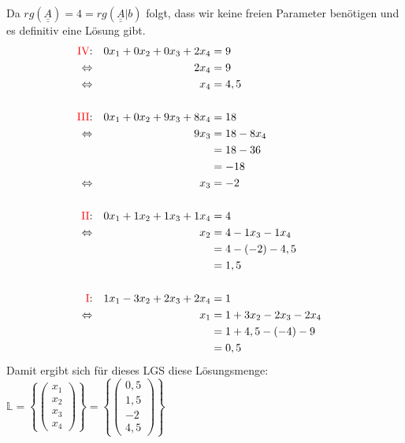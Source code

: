 \documentclass[]{article}
\newcommand{\IT}[1]{\underline{\underline{#1}}}
\newcommand{\eq}{\Leftrightarrow}
\newcommand{\red}[1]{\textcolor{red}{#1}}
\begin{document}
Da $rg(\IT{A}) = 4 = rg(\IT{A}|b)$ folgt, dass wir keine freien Parameter benötigen und es definitiv eine Lösung gibt.
\begin{align*}
	\text{\red{IV}:}&& 0x_1 + 0x_2 + 0x_3 + 2x_4 &= 9 &&\\
	\eq&& 2x_4 &= 9 &&\\
	\eq&& x_4 &= 4,5 &&\\
	\\
	\text{\red{III}:}&& 0x_1 + 0x_2 + 9x_3 + 8x_4 &= 18 &&\\
	\eq&& 9x_3 &= 18 - 8x_4&&\\
	&& &= 18 - 36&&\\
	&& &= -18&&\\
	\eq&& x_3&= -2&&\\
	\\
	\text{\red{II}:}&& 0x_1 + 1x_2 + 1x_3 + 1x_4 &= 4 &&\\
	\eq&& x_2 &= 4 - 1x_3 - 1x_4&&\\
	&& &= 4 - (-2) - 4,5&&\\
	&& &= 1,5&&\\
	\\
	\text{\red{I}:}&& 1x_1 - 3x_2 + 2x_3 + 2x_4 &= 1 &&\\
	\eq&& x_1 &= 1 + 3x_2 - 2x_3 - 2x_4&&\\
	&& &= 1 + 4,5 - (-4) - 9&&\\
	&& &= 0,5&&\\
\end{align*}
Damit ergibt sich für dieses LGS diese Lösungsmenge:
$ \mathbb{L} = \left\{\begin{pmatrix}x_1\\x_2\\x_3\\x_4 \end{pmatrix}\right\} = \left\{\begin{pmatrix}0,5\\1,5\\-2\\4,5 \end{pmatrix}\right\}$
\end{document}
